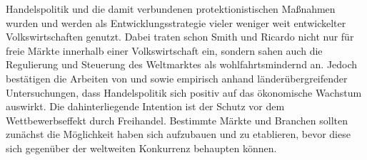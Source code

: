 Handelspolitik und die damit verbundenen protektionistischen Ma{\ss}nahmen wurden und werden als Entwicklungsstrategie vieler weniger weit entwickelter Volkswirtschaften genutzt. Dabei traten schon Smith und Ricardo nicht nur f{\"u}r freie M{\"a}rkte innerhalb einer Volkswirtschaft ein, sondern sahen auch die Regulierung und Steuerung des Weltmarktes als wohlfahrtsmindernd an. Jedoch best{\"a}tigen die Arbeiten von \citet{Dollar.1992,BenDavid.1993,Sachs.1995,Frankel.1999} und \citet{Edwards.1993} sowie \citet{RodriguezCaballero.2000} empirisch anhand l{\"a}nder{\"u}bergreifender Untersuchungen, dass Handelspolitik sich positiv auf das {\"o}konomische Wachstum auswirkt. Die dahinterliegende Intention ist der Schutz vor dem Wettbewerbseffekt durch Freihandel. Bestimmte M{\"a}rkte und Branchen sollten zun{\"a}chst die M{\"o}glichkeit haben sich aufzubauen und zu etablieren, bevor diese sich gegen{\"u}ber der weltweiten Konkurrenz behaupten k{\"o}nnen. \newline


